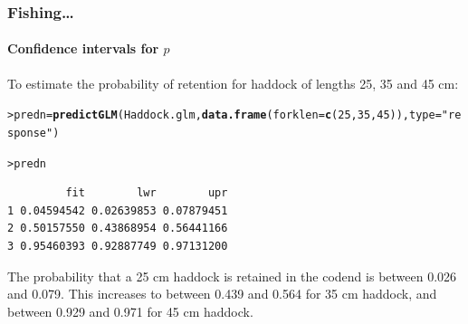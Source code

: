 \documentclass{beamer}\usepackage[]{graphicx}\usepackage[]{xcolor}
\makeatletter
\newcommand{\hlnum}[1]{\textcolor[rgb]{0.686,0.059,0.569}{#1}}%
\newcommand{\hlstr}[1]{\textcolor[rgb]{0.192,0.494,0.8}{#1}}%
\newcommand{\hlstd}[1]{\textcolor[rgb]{0.345,0.345,0.345}{#1}}%
\newcommand{\hlkwb}[1]{\textcolor[rgb]{0.69,0.353,0.396}{#1}}%
\newcommand{\hlkwc}[1]{\textcolor[rgb]{0.333,0.667,0.333}{#1}}%
\newcommand{\hlkwd}[1]{\textcolor[rgb]{0.737,0.353,0.396}{\textbf{#1}}}%
\newenvironment{kframe}{%
 \def\at@end@of@kframe{}%
 \ifinner\ifhmode%
  \def\at@end@of@kframe{\end{minipage}}%
  \begin{minipage}{\columnwidth}%
 \fi\fi%
 \def\FrameCommand##1{\hskip\@totalleftmargin \hskip-\fboxsep
 \colorbox{shadecolor}{##1}\hskip-\fboxsep
     \hskip-\linewidth \hskip-\@totalleftmargin \hskip\columnwidth}%
 \MakeFramed {\advance\hsize-\width
   \@totalleftmargin\z@ \linewidth\hsize
   \@setminipage}}%
 {\par\unskip\endMakeFramed%
 \at@end@of@kframe}
\newenvironment{knitrout}{}{} %
\makeatother
\begin{document}
\begin{frame}[fragile]
\frametitle{Fishing\ldots}
\framesubtitle{Confidence intervals for $p$}
To estimate the probability of retention for haddock of lengths 25, 35 and 45 cm:
\bigskip

\begin{knitrout}\scriptsize
{}\color{fgcolor}\begin{kframe}
\begin{alltt}
\hlstd{> }\hlstd{predn}\hlkwb{=}\hlkwd{predictGLM}\hlstd{(Haddock.glm,} \hlkwd{data.frame}\hlstd{(}\hlkwc{forklen}\hlstd{=}\hlkwd{c}\hlstd{(}\hlnum{25}\hlstd{,}\hlnum{35}\hlstd{,}\hlnum{45}\hlstd{)),} \hlkwc{type}\hlstd{=}\hlstr{"response"}\hlstd{)}
\end{alltt}


{\ttfamily\noindent\itshape\color{messagecolor}{***Estimates and CIs are on the response scale***}}\begin{alltt}
\hlstd{> }\hlstd{predn}
\end{alltt}
\begin{verbatim}
         fit        lwr        upr
1 0.04594542 0.02639853 0.07879451
2 0.50157550 0.43868954 0.56441166
3 0.95460393 0.92887749 0.97131200
\end{verbatim}
\end{kframe}
\end{knitrout}
\bigskip

The probability that a 25 cm haddock is retained in the codend is between 0.026 and 0.079. This increases to between 0.439 and 0.564 for 35 cm haddock, and between 0.929 and 0.971 for 45 cm haddock.


\end{frame}



\end{document}
